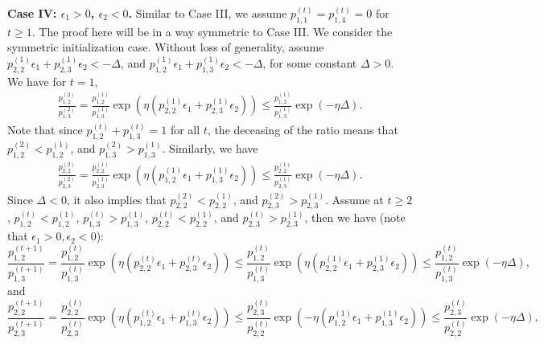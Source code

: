 \noindent \textbf{Case IV: $\epsilon_1>0$, $\epsilon_2<0$.} Similar to Case III, we assume $p^{(t)}_{1,1}=p^{(t)}_{1,4}=0$ for $t\geq1$. The proof here will be in a way symmetric to Case III.   We  consider the symmetric initialization case. Without loss of generality, assume $p^{(1)}_{2,2}\epsilon_1+p^{(1)}_{2,3}\epsilon_2<-\Delta$, and $p^{(1)}_{1,2}\epsilon_1+p^{(1)}_{1,3}\epsilon_2<-\Delta$, for some constant $\Delta>0$.  We have for $t=1$, 
\begin{equation*}
    \begin{split}
\frac{p^{(2)}_{1,2}}{p^{(2)}_{1,3}} = \frac{p^{(1)}_{1,2}}{p^{(1)}_{1,3}}\exp\left(\eta\left(p^{(1)}_{2,2}\epsilon_1 + p^{(1)}_{2,3}\epsilon_2\right)\right)\leq    \frac{p^{(1)}_{1,2}}{p^{(1)}_{1,3}}\exp(-\eta\Delta). 
    \end{split}
\end{equation*}
Note that since $p^{(t)}_{1,2}+p^{(t)}_{1,3}=1$ for all $t$, the deceasing of the ratio means that $p^{(2)}_{1,2}< p^{(1)}_{1,2}$, and $p^{(2)}_{1,3}> p^{(1)}_{1,3}$. Similarly, we have
\begin{equation*}
    \begin{split}
\frac{p^{(2)}_{2,2}}{p^{(2)}_{2,3}} = \frac{p^{(1)}_{2,2}}{p^{(1)}_{2,3}}\exp\left(\eta\left(p^{(1)}_{1,2}\epsilon_1 + p^{(1)}_{1,3}\epsilon_2\right)\right) \leq   \frac{p^{(1)}_{2,2}}{p^{(1)}_{2,3}}\exp(-\eta \Delta). 
    \end{split}
\end{equation*}
Since $\Delta<0$, it also implies that $p^{(2)}_{2,2}<p^{(1)}_{2,2}$, and $p^{(2)}_{2,3}>p^{(1)}_{2,3}$. Assume at $t\geq 2$, $p^{(t)}_{1,2}< p^{(1)}_{1,2}$,  $p^{(t)}_{1,3}> p^{(1)}_{1,3}$, $p^{(t)}_{2,2}<p^{(1)}_{2,2}$, and $p^{(t)}_{2,3}>p^{(1)}_{2,3}$, then we have (note that $\epsilon_1>0, \epsilon_2<0$):
\[
  \frac{p^{(t+1)}_{1,2}}{p^{(t+1)}_{1,3}} = \frac{p^{(t)}_{1,2}}{p^{(t)}_{1,3}}\exp\left(\eta\left(p^{(t)}_{2,2}\epsilon_1 + p^{(t)}_{2,3}\epsilon_2\right)\right) \leq \frac{p^{(t)}_{1,2}}{p^{(t)}_{1,3}}\exp\left(\eta\left(p^{(1)}_{2,2}\epsilon_1 + p^{(1)}_{2,3}\epsilon_2\right)\right)\leq \frac{p^{(t)}_{1,2}}{p^{(t)}_{1,3}}\exp(-\eta \Delta),
\]
and 
\[
  \frac{p^{(t+1)}_{2,2}}{p^{(t+1)}_{2,3}} = \frac{p^{(t)}_{2,2}}{p^{(t)}_{2,3}}\exp\left(\eta\left(p^{(t)}_{1,2}\epsilon_1 + p^{(t)}_{1,3}\epsilon_2\right)\right) \leq \frac{p^{(t)}_{2,3}}{p^{(t)}_{2,2}}\exp\left(-\eta\left(p^{(1)}_{1,2}\epsilon_1 + p^{(1)}_{1,3}\epsilon_2\right)\right)\leq \frac{p^{(t)}_{2,3}}{p^{(t)}_{2,2}}\exp(-\eta \Delta),
\]

